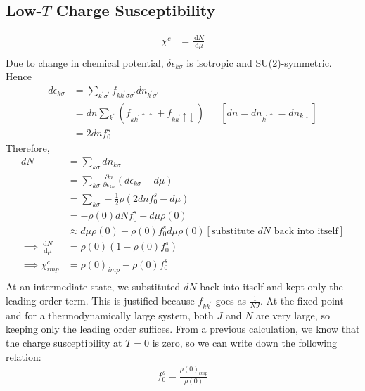 \documentclass[12pt,twoside]{report}
\numberwithin{equation}{section}
\begin{document}
\subsection{Low-\(T\) Charge Susceptibility}
\begin{equation}\begin{aligned}
	\chi^c &= \frac{\:\mathrm{d}N}{\:\mathrm{d}\mu}\\
\end{aligned}\end{equation}
Due to change in chemical potential, \(\delta\epsilon_{k\sigma}\) is isotropic and SU(2)-symmetric. Hence
\begin{equation}\begin{aligned}
	d\epsilon_{k\sigma} &= \sum_{k^\prime\sigma^\prime}f_{kk^\prime\sigma\sigma^\prime}d n_{k^\prime\sigma^\prime}\\
			    &= d n\sum_{k^\prime}\left(f_{kk^\prime\uparrow \uparrow} + f_{kk^\prime \uparrow \downarrow}\right) && \left[dn = dn_{k^\prime \uparrow} = dn_{k \downarrow}\right] \\
			    &= 2dn f_0^s
\end{aligned}\end{equation}
Therefore,
\begin{equation}\begin{aligned}
	dN &= \sum_{k\sigma}dn_{k\sigma} \\
	   &= \sum_{k\sigma}\frac{\partial{n}}{\partial{\epsilon_{k\sigma}}}\left( d\epsilon_{k\sigma} - d\mu \right) \\
	   &= \sum_{k\sigma}-\frac{1}{2}\rho\left(2dn f_0^s - d\mu \right) \\
	   &= -\rho(0) d N f_0^s + d\mu \rho(0) \\
	   &\approx d\mu \rho(0) - \rho(0) f_0^s d\mu \rho(0) \left[\text{substitute \(dN\) back into itself}\right] \\
	\implies \frac{\:\mathrm{d}N}{\:\mathrm{d}\mu} &= \rho(0)\left( 1 - \rho(0)f_0^s \right) \\
	\implies \chi^c_{imp} &= \rho(0)_{imp} - \rho(0)f_0^s \\
\end{aligned}\end{equation}
At an intermediate state, we substituted \(dN\) back into itself and kept only the leading order term. This is justified because \(f_{kk^\prime}\) goes as \(\frac{1}{N J}\). At the fixed point and for a thermodynamically large system, both \(J\) and \(N\) are very large, so keeping only the leading order suffices.
\pb From a previous calculation, we know that the charge susceptibility at \(T=0\) is zero, so we can write down the following relation:
\begin{equation}\begin{aligned}
	\label{fp_constraint}
	f_0^s = \frac{\rho(0)_{imp}}{\rho(0)}
\end{aligned}\end{equation}
\end{document}
